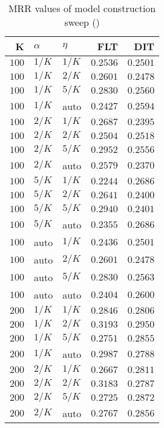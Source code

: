 
\begin{table}
\begin{spacing}{1.2}
\centering
\caption{MRR values of \mahout model construction sweep (\cone)}
\label{table:mahout_model_sweep}
\vspace{0.2em}
\parbox{.45\linewidth}{\centering \begin{tabular}{rll|rr}
\toprule
    K &  $\alpha$ &    $\eta$ &      FLT &      DIT \\
\midrule
$100$ &  $1/K$ &  $1/K$ & $0.2536$ & $0.2501$ \\
$100$ &  $1/K$ &  $2/K$ & $0.2601$ & $0.2478$ \\
$100$ &  $1/K$ &  $5/K$ & $0.2830$ & $0.2560$ \\
$100$ &  $1/K$ &   auto & $0.2427$ & $0.2594$ \\
$100$ &  $2/K$ &  $1/K$ & $0.2687$ & $0.2395$ \\
$100$ &  $2/K$ &  $2/K$ & $0.2504$ & $0.2518$ \\
$100$ &  $2/K$ &  $5/K$ & $0.2952$ & $0.2556$ \\
$100$ &  $2/K$ &   auto & $0.2579$ & $0.2370$ \\
$100$ &  $5/K$ &  $1/K$ & $0.2244$ & $0.2686$ \\
$100$ &  $5/K$ &  $2/K$ & $0.2641$ & $0.2400$ \\
$100$ &  $5/K$ &  $5/K$ & $0.2940$ & $0.2401$ \\
$100$ &  $5/K$ &   auto & $0.2355$ & $0.2686$ \\
$100$ &   auto &  $1/K$ & $0.2436$ & $0.2501$ \\
$100$ &   auto &  $2/K$ & $0.2601$ & $0.2478$ \\
$100$ &   auto &  $5/K$ & $0.2830$ & $0.2563$ \\
$100$ &   auto &   auto & $0.2404$ & $0.2600$ \\
$200$ &  $1/K$ &  $1/K$ & $0.2846$ & $0.2806$ \\
$200$ &  $1/K$ &  $2/K$ & $0.3193$ & $0.2950$ \\
$200$ &  $1/K$ &  $5/K$ & $0.2751$ & $0.2855$ \\
$200$ &  $1/K$ &   auto & $0.2987$ & $0.2788$ \\
$200$ &  $2/K$ &  $1/K$ & $0.2667$ & $0.2811$ \\
$200$ &  $2/K$ &  $2/K$ & $0.3183$ & $0.2787$ \\
$200$ &  $2/K$ &  $5/K$ & $0.2725$ & $0.2872$ \\
$200$ &  $2/K$ &   auto & $0.2767$ & $0.2856$ \\

\end{tabular}}
\end{spacing}
\end{table}
